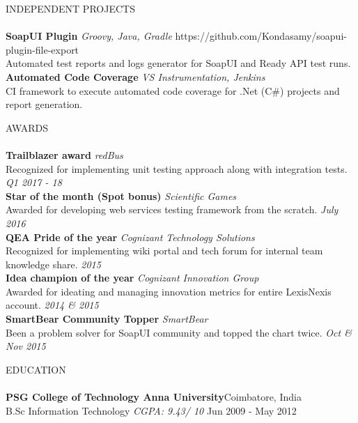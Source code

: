 \documentclass[a4paper]{article}
\newcommand{\lineunder} {
    \vspace*{-8pt} \\
    \hspace*{-18pt} \hrulefill \\
}
\newcommand{\header} [1] {
    {\hspace*{-18pt}\vspace*{6pt} \textsc{#1}}
    \vspace*{-6pt} \lineunder
}
\begin{document}
\header{INDEPENDENT PROJECTS}
{\textbf{SoapUI Plugin}} {\sl Groovy, Java, Gradle} \hfill https://github.com/Kondasamy/soapui-plugin-file-export\\
Automated test reports and logs generator for SoapUI and Ready API test runs.\\
\vspace*{2mm}
{\textbf{Automated Code Coverage}} {\sl VS Instrumentation, Jenkins} \\
CI framework to execute automated code coverage for .Net (C\#) projects and report generation.\\
\vspace*{2mm}

\header{AWARDS}
\textbf{Trailblazer award} \hfill \textit{redBus}\\
Recognized for implementing unit testing approach along with integration tests. \hfill \textit{Q1 2017 - 18}\\
\vspace*{1mm}
\textbf{Star of the month (Spot bonus)} \hfill \textit{Scientific Games}\\
Awarded for developing web services testing framework from the scratch. \hfill \textit{July 2016}\\
\vspace*{1mm}
\textbf{QEA Pride of the year} \hfill \textit{Cognizant Technology Solutions}\\
Recognized for implementing wiki portal and tech forum for internal team knowledge share. \hfill \textit{2015}\\
\vspace*{1mm}
\textbf{Idea champion of the year} \hfill \textit{Cognizant Innovation Group}\\
Awarded for ideating and managing innovation metrics for entire LexisNexis account. \hfill \textit{2014 \& 2015}\\
\vspace*{1mm}
\textbf{SmartBear Community Topper} \hfill \textit{SmartBear}\\
Been a problem solver for SoapUI community and topped the chart twice. \hfill \textit{Oct \& Nov 2015}\\
\vspace*{1mm}

\header{EDUCATION}
\textbf{PSG College of Technology \textbar{} Anna University}\hfill Coimbatore, India\\
B.Sc Information Technology \textit{CGPA: 9.43/ 10} \hfill Jun 2009 - May 2012\\
\vspace{2mm}

\ 
\end{document}
